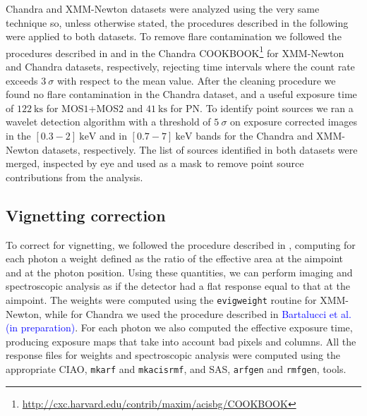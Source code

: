 \documentclass[twocolumn,traditabstract]{aa}
\begin{document}
Chandra and XMM-Newton datasets were analyzed using the very same technique so, unless otherwise stated, the procedures described in the following were applied to both datasets. To remove flare contamination we followed the procedures described in \cite{pratt2007} and in the Chandra COOKBOOK\footnote{\label{fn2}\url{http://cxc.harvard.edu/contrib/maxim/acisbg/COOKBOOK}} for XMM-Newton and Chandra datasets, respectively, rejecting time intervals where the count rate exceeds $3 \ \sigma$ with respect to the mean value. After the cleaning procedure we found no flare contamination in the Chandra dataset, and a useful exposure time of $\SI{122}{\kilo\second}$ for MOS$1$+MOS$2$ and $\SI{41}{\kilo\second}$ for PN. To identify point sources we ran a wavelet detection algorithm with a threshold of $5 \ \sigma$ on exposure corrected images in the $[0.3-2] \ \si{\kilo\electronvolt}$ and in $[0.7-7] \ \si{\kilo\electronvolt}$ bands for the Chandra and XMM-Newton datasets, respectively. The list of sources identified in both datasets were merged, inspected by eye and used as a mask to remove point source contributions from the analysis.

\subsection{Vignetting correction}
To correct for vignetting, we followed the procedure described in \cite{arnaud2001}, computing for each photon a weight defined as the ratio of the effective area at the aimpoint and at the photon position. Using these quantities, we can perform imaging and spectroscopic analysis as if the detector had a flat response equal to that at the aimpoint. The weights were computed using the \verb?evigweight? routine for XMM-Newton, while for Chandra we used the procedure described in \textcolor{blue}{Bartalucci et al. (in preparation)}. For each photon we also computed the effective exposure time, producing exposure maps that take into account bad pixels and columns. All the response files for weights and spectroscopic analysis were computed using the appropriate CIAO, \verb?mkarf? and \verb?mkacisrmf?, and SAS, \verb?arfgen? and \verb?rmfgen?, tools.

\end{document}
